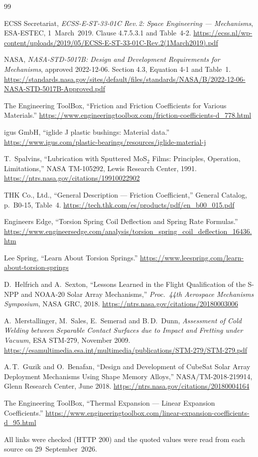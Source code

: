\documentclass[11pt]{article}
\begin{document}
\begin{thebibliography}{99}
\small

ECSS Secretariat, \emph{ECSS-E-ST-33-01C Rev.\,2: Space Engineering --- Mechanisms}, ESA-ESTEC,
1~March~2019. Clause 4.7.5.3.1 and Table~4-2.
\url{https://ecss.nl/wp-content/uploads/2019/05/ECSS-E-ST-33-01C-Rev.2(1March2019).pdf}

NASA, \emph{NASA-STD-5017B: Design and Development Requirements for Mechanisms}, approved 2022-12-06.
Section 4.3, Equation 4-1 and Table~1.
\url{https://standards.nasa.gov/sites/default/files/standards/NASA/B/2022-12-06-NASA-STD-5017B-Approved.pdf}

The Engineering ToolBox, ``Friction and Friction Coefficients for Various Materials.''
\url{https://www.engineeringtoolbox.com/friction-coefficients-d_778.html}

igus GmbH, ``iglide J plastic bushings: Material data.''
\url{https://www.igus.com/plastic-bearings/resources/iglide-material-j}

T.~Spalvins, ``Lubrication with Sputtered MoS$_2$ Films: Principles, Operation, Limitations,''
NASA TM-105292, Lewis Research Center, 1991.
\url{https://ntrs.nasa.gov/citations/19910022902}

THK Co., Ltd., ``General Description --- Friction Coefficient,'' General Catalog, p.~B0-15, Table~4.
\url{https://tech.thk.com/es/products/pdf/en_b00_015.pdf}

Engineers Edge, ``Torsion Spring Coil Deflection and Spring Rate Formulas.''
\url{https://www.engineersedge.com/analysis/torsion_spring_coil_deflection_16436.htm}

Lee Spring, ``Learn About Torsion Springs.''
\url{https://www.leespring.com/learn-about-torsion-springs}

D.~Helfrich and A.~Sexton, ``Lessons Learned in the Flight Qualification of the S-NPP and NOAA-20 Solar
Array Mechanisms,'' \emph{Proc.\ 44th Aerospace Mechanisms Symposium}, NASA GRC, 2018.
\url{https://ntrs.nasa.gov/citations/20180003006}

A.~Merstallinger, M.~Sales, E.~Semerad and B.\,D.~Dunn, \emph{Assessment of Cold Welding between
Separable Contact Surfaces due to Impact and Fretting under Vacuum}, ESA STM-279, November 2009.
\url{https://esamultimedia.esa.int/multimedia/publications/STM-279/STM-279.pdf}

A.\,T.~Guzik and O.~Benafan, ``Design and Development of CubeSat Solar Array Deployment Mechanisms Using
Shape Memory Alloys,'' NASA/TM-2018-219914, Glenn Research Center, June 2018.
\url{https://ntrs.nasa.gov/citations/20180004164}

The Engineering ToolBox, ``Thermal Expansion --- Linear Expansion Coefficients.''
\url{https://www.engineeringtoolbox.com/linear-expansion-coefficients-d_95.html}

\end{thebibliography}

\noindent\footnotesize All links were checked (HTTP 200) and the quoted values were read from each source on
29~September~2026.
\end{document}
